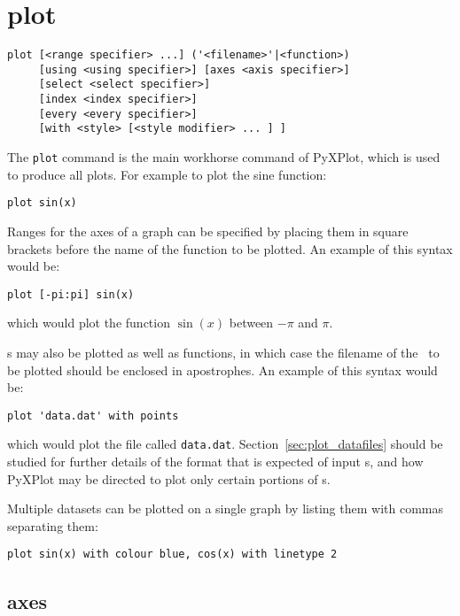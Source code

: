 \section{plot}

\begin{verbatim}
plot [<range specifier> ...] ('<filename>'|<function>)
     [using <using specifier>] [axes <axis specifier>]
     [select <select specifier>]
     [index <index specifier>]
     [every <every specifier>]
     [with <style> [<style modifier> ... ] ]
\end{verbatim}

The {\tt plot} command is the main workhorse command of PyXPlot, which is used
to produce all plots. For example to plot the sine function:

\begin{verbatim}
plot sin(x)
\end{verbatim}

Ranges for the axes of a graph can be specified by placing them in
square brackets before the name of the function to be plotted. An example of
this syntax would be:

\begin{verbatim}
plot [-pi:pi] sin(x)
\end{verbatim}

\noindent which would plot the function $\sin(x)$ between $-\pi$ and $\pi$.

\Datafile s may also be plotted as well as functions, in which case the filename
of the \datafile\ to be plotted should be enclosed in apostrophes. An example of
this syntax would be:

\begin{verbatim}
plot 'data.dat' with points
\end{verbatim}

\noindent which would plot the file called {\tt data.dat}.
Section~\ref{sec:plot_datafiles} should be studied for further details of the
format that is expected of input \datafile s, and how PyXPlot may be directed
to plot only certain portions of \datafile s.

Multiple datasets can be plotted on a single graph by listing them with commas
separating them:

\begin{verbatim}
plot sin(x) with colour blue, cos(x) with linetype 2
\end{verbatim}

\subsection{axes}

